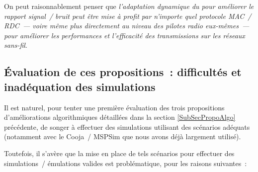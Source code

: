 \begin{enumerate}
On peut raisonnablement penser que \emph{l'adaptation dynamique du
 pour améliorer le rapport signal~/ bruit peut être
mise à profit par n'importe quel protocole MAC~/ RDC~--- voire même plus
directement au niveau des pilotes radio eux-mêmes~--- pour améliorer les
performances et l'efficacité des transmissions sur les réseaux sans-fil}.

\end{enumerate}


\subsection{\'Evaluation de ces propositions~: difficultés et
            inadéquation des simulations}
\label{SubSecEvalAlgoSimu}

Il est naturel, pour tenter une première évaluation des trois
propositions d'améliorations algorithmiques détaillées dans la section
\ref{SubSecPropoAlgo} précédente, de songer à effectuer des simulations
utilisant des scénarios adéquats (notamment avec le  Cooja~/
MSPSim que nous avons déjà largement utilisé).

Toutefois, il s'avère que la mise en place de tels scénarios pour effectuer
des simulations~/ émulations valides est problématique, pour les raisons
suivantes~:

